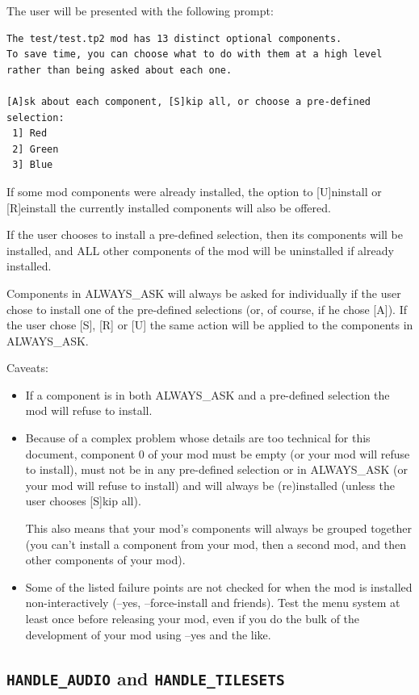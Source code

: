\documentclass{article}
\def\t#1{{\tt #1}}
\begin{document}
The user will be presented with the following prompt:

\begin{verbatim}
The test/test.tp2 mod has 13 distinct optional components.
To save time, you can choose what to do with them at a high level rather than being asked about each one.

[A]sk about each component, [S]kip all, or choose a pre-defined selection:
 1] Red
 2] Green
 3] Blue
\end{verbatim}

If some mod components were already installed, the option to [U]ninstall
or [R]einstall the currently installed components will also be offered.

If the user chooses to install a pre-defined selection, then its components
will be installed, and ALL other components of the mod will be uninstalled
if already installed.

Components in ALWAYS_ASK will always be asked for individually if the user
chose to install one of the pre-defined selections (or, of course, if he chose
[A]). If the user chose [S], [R] or [U] the same action will be applied to the
components in ALWAYS_ASK.

Caveats:
\begin{itemize}
\item If a component is in both ALWAYS_ASK and a pre-defined selection the mod
will refuse to install.
\item Because of a complex problem whose details are too technical for this
document, component 0 of your mod must be empty (or your mod will refuse to
install), must not be in any pre-defined selection or in ALWAYS_ASK (or your
mod will refuse to install) and will always be (re)installed (unless the user
chooses [S]kip all).

This also means that your mod's components will always be grouped together (you
can't install a component from your mod, then a second mod, and then other
components of your mod).
\item Some of the listed failure points are not checked for when the mod is
installed non-interactively (--yes, --force-install and friends). Test the menu
system at least once before releasing your mod, even if you do the bulk of the
development of your mod using --yes and the like.
\end{itemize}

\label{sec-handle-audio-and-handle-tilesets}\subsection{\t{HANDLE_AUDIO} and \t{HANDLE_TILESETS}}
\end{document}
